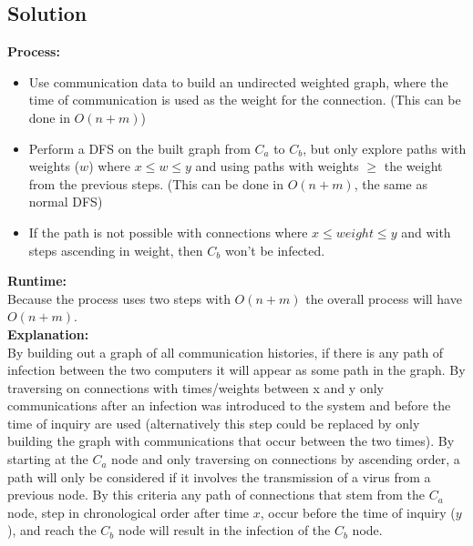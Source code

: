 \documentclass[11pt]{article}
\begin{document}
\subsection*{Solution}
\textbf{Process:}
\begin{itemize}

\item Use communication data to build an undirected weighted graph, where the time of communication is used as the weight for the connection. (This can be done in $O(n+m)$)\\

\item Perform a DFS on the built graph from $C_a$ to $C_b$, but only explore paths with weights ($w$) where $x \leq{w} \leq{y}$ and using paths with weights $\geq$ the weight from the previous steps. (This can be done in $O(n+m)$, the same as normal DFS)\\

\item If the path is not possible with connections where $x \leq{weight} \leq{y}$ and with steps ascending in weight, then $C_b$ won't be infected.

\end{itemize}

\noindent \textbf{Runtime:}\\
Because the process uses two steps with $O(n+m)$ the overall process will have $O(n+m)$.\\

\noindent \textbf{Explanation:}\\
By building out a graph of all communication histories, if there is any path of infection between the two computers it will appear as some path in the graph. By traversing on connections with times/weights between x and y only communications after an infection was introduced to the system and before the time of inquiry are used (alternatively this step could be replaced by only building the graph with communications that occur between the two times). By starting at the $C_a$ node and only traversing on connections by ascending order, a path will only be considered if it involves the transmission of a virus from a previous node. By this criteria any path of connections that stem from the $C_a$ node, step in chronological order after time $x$, occur before the time of inquiry ($y$), and reach the $C_b$ node will result in the infection of the $C_b$ node. 
\end{document}
